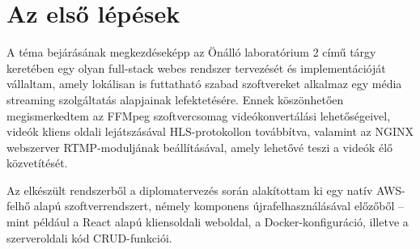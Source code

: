 \section{Az első lépések}

A téma bejárásának megkezdéseképp az Önálló laboratórium 2 című tárgy keretében egy olyan full-stack webes rendszer tervezését és implementációját vállaltam, amely lokálisan is futtatható szabad szoftvereket alkalmaz egy média streaming szolgáltatás alapjainak lefektetésére. Ennek köszönhetően megismerkedtem az FFMpeg szoftvercsomag videókonvertálási lehetőségeivel, videók kliens oldali lejátszásával HLS-protokollon továbbítva, valamint az NGINX webszerver RTMP-moduljának beállításával, amely lehetővé teszi a videók élő közvetítését.

Az elkészült rendszerből a diplomatervezés során alakítottam ki egy natív AWS-felhő alapú szoftverrendszert, némely komponens újrafelhasználásával előzőből -- mint például a React alapú kliensoldali weboldal, a Docker-konfiguráció, illetve a szerveroldali kód CRUD-funkciói.
